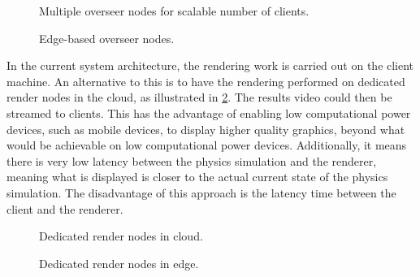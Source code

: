 \begin{figure}
	\centering
	\scalebox{1.25}{}
	\caption{Multiple overseer nodes for scalable number of clients.}
	\label{MultiOverseer}
\end{figure}

\begin{figure}
	\centering
	\scalebox{1.25}{}
	\caption{Edge-based overseer nodes.}
\end{figure}

In the current system architecture, the rendering work is carried out on the client machine. An alternative to this is to have the rendering performed on dedicated render nodes in the cloud, as illustrated in \ref{RenderNodes}. The results video could then be streamed to clients. This has the advantage of enabling low computational power devices, such as mobile devices, to display higher quality graphics, beyond what would be achievable on low computational power devices. Additionally, it means there is very low latency between the physics simulation and the renderer, meaning what is displayed is closer to the actual current state of the physics simulation. The disadvantage of this approach is the latency time between the client and the renderer.


\begin{figure}
	\centering
	\scalebox{1.25}{}
	\caption{Dedicated render nodes in cloud.}
	\label{RenderNodes}
\end{figure}

\begin{figure}
	\centering
	\scalebox{1.25}{}
	\caption{Dedicated render nodes in edge.}
\end{figure}


